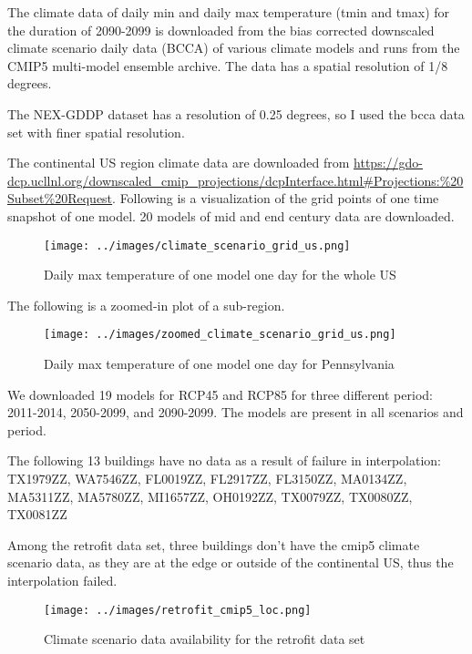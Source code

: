 \documentclass[12pt]{article}
\begin{document}
The climate data of daily min and daily max temperature (tmin and tmax) for the
duration of 2090-2099 is downloaded from the bias corrected downscaled climate
scenario daily data (BCCA) of various climate models and runs from the CMIP5
multi-model ensemble archive. The data has a spatial resolution of 1/8 degrees.

The NEX-GDDP dataset has a resolution of 0.25 degrees, so I used the bcca data
set with finer spatial resolution.

The continental US region climate data are downloaded from
\url{https://gdo-dcp.ucllnl.org/downscaled_cmip_projections/dcpInterface.html#Projections:%20Subset%20Request}.
Following is a visualization of the grid points of one time snapshot of one
model. 20 models of mid and end century data are downloaded.

\begin{figure}[H]
  \centering
  \texttt{[image: ../images/climate\_scenario\_grid\_us.png]}
  \caption[daily max temperature grid]{Daily max temperature of one model one
    day for the whole US}
  \label{fig:climate_scenario_grid_us}
\end{figure}

The following is a zoomed-in plot of a sub-region.
\begin{figure}[H]
  \centering
  \texttt{[image: ../images/zoomed\_climate\_scenario\_grid\_us.png]}
  \caption[daily max temperature grid]{Daily max temperature of one model one
    day for Pennsylvania}
  \label{fig:zoomed_climate_scenario_grid_us}
\end{figure}

We downloaded 19 models for RCP45 and RCP85 for three different period:
2011-2014, 2050-2099, and 2090-2099. The models are present in all scenarios and period.

The following 13 buildings have
no data as a result of failure in interpolation: TX1979ZZ, WA7546ZZ, FL0019ZZ,
FL2917ZZ, FL3150ZZ, MA0134ZZ, MA5311ZZ, MA5780ZZ, MI1657ZZ, OH0192ZZ, TX0079ZZ,
TX0080ZZ, TX0081ZZ

Among the retrofit data set, three buildings don't have the cmip5 climate
scenario data, as they are at the edge or outside of the continental US, thus
the interpolation failed.

\begin{figure}[H]
  \centering
  \texttt{[image: ../images/retrofit\_cmip5\_loc.png]}
  \caption[cmip5 availability for retrofit data set]{Climate scenario data
    availability for the retrofit data set}
  \label{fig:retrofit_cmip5_loc}
\end{figure}
\end{document}
